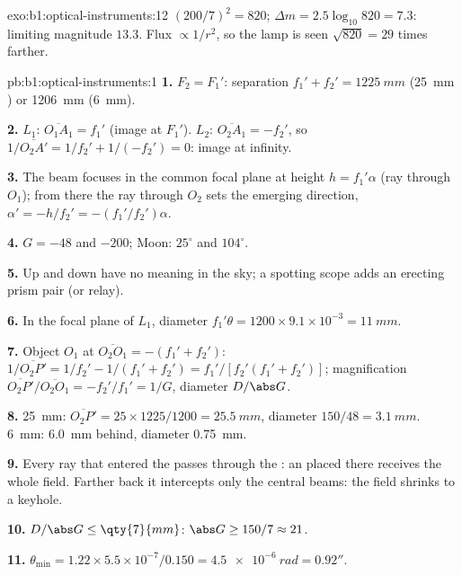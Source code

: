 \begin{solution}{exo:b1:optical-instruments:12}
$(200/7)^2 = 820$; $\Delta m = 2.5\log_{10}820 = 7.3$: limiting
magnitude $13.3$. Flux $\propto 1/r^2$, so the lamp is seen
$\sqrt{820} = 29$ times farther.
\end{solution}

\begin{solution}{pb:b1:optical-instruments:1}
\textbf{1.} $F_2 = F_1'$: separation $f_1' + f_2' = \qty{1225}{mm}$
(\qty{25}{mm} ) or \qty{1206}{mm} (\qty{6}{mm}).

\textbf{2.} $L_1$: $\overline{O_1A_1} = f_1'$ (image at $F_1'$). $L_2$:
$\overline{O_2A_1} = -f_2'$, so $1/\overline{O_2A'} = 1/f_2' + 1/(-f_2')
= 0$: image at infinity.

\textbf{3.} The beam focuses in the common focal plane at height $h =
f_1'\alpha$ (ray through $O_1$); from there the ray through $O_2$ sets
the emerging direction, $\alpha' = -h/f_2' = -(f_1'/f_2')\alpha$.

\textbf{4.} $G = -48$ and $-200$; Moon: $25^\circ$ and $104^\circ$.

\textbf{5.} Up and down have no meaning in the sky; a spotting scope
adds an erecting prism pair (or  relay).

\textbf{6.} In the focal plane of $L_1$, diameter $f_1'\theta = 1200 \times
9.1\times10^{-3} = \qty{11}{mm}$.

\textbf{7.} Object $O_1$ at $\overline{O_2O_1} = -(f_1' + f_2')$:
$1/\overline{O_2P'} = 1/f_2' - 1/(f_1' + f_2') = f_1'/[f_2'(f_1' + f_2')]$;
magnification $\overline{O_2P'}/\overline{O_2O_1} = -f_2'/f_1' = 1/G$,
diameter $D/\abs G$.

\textbf{8.} \qty{25}{mm}: $\overline{O_2P'} = 25 \times 1225/1200 =
\qty{25.5}{mm}$, diameter $150/48 = \qty{3.1}{mm}$. \qty{6}{mm}:
\qty{6.0}{mm} behind, diameter \qty{0.75}{mm}.

\textbf{9.} Every ray that entered the  passes through the : an  placed there receives the whole field. Farther back it
intercepts only the central beams: the field shrinks to a keyhole.

\textbf{10.} $D/\abs G \leq \qty{7}{mm}$: $\abs G \geq 150/7 \approx 21$.

\textbf{11.} $\theta_{\min} = 1.22 \times 5.5\times10^{-7}/0.150 =
\qty{4.5e-6}{rad} = 0.92''$.


\end{solution}
